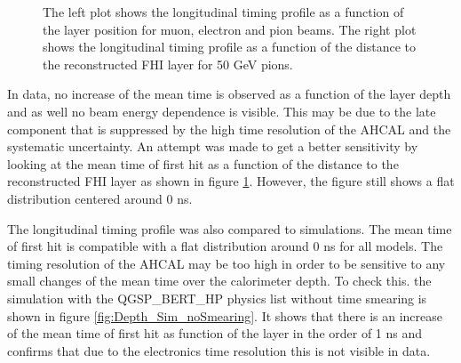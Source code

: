 \begin{figure}[htbp!]
\begin{subfigure}[t]{0.5\textwidth}
		\caption{}\label{fig:Depth_Comparison_FHI}
	\end{subfigure}
	\caption{The left plot shows the longitudinal timing profile as a function of the layer position for muon, electron and pion beams. The right plot shows the longitudinal timing profile as a function of the distance to the reconstructed FHI layer for 50 GeV pions.}
	\label{fig:DepthProfile}
\end{figure}

In data, no increase of the mean time is observed as a function of the layer depth and as well no beam energy dependence is visible. This may be due to the late component that is suppressed by the high time resolution of the AHCAL and the systematic uncertainty. An attempt was made to get a better sensitivity by looking at the mean time of first hit as a function of the distance to the reconstructed FHI layer as shown in figure \ref{fig:Depth_Comparison_FHI}. However, the figure still shows a flat distribution centered around 0 ns.

The longitudinal timing profile was also compared to simulations. The mean time of first hit is compatible with a flat distribution around 0 ns for all models. The timing resolution of the AHCAL may be too high in order to be sensitive to any small changes of the mean time over the calorimeter depth. To check this. the simulation with the QGSP\_BERT\_HP physics list without time smearing is shown in figure \ref{fig:Depth_Sim_noSmearing}. It shows that there is an increase of the mean time of first hit as function of the layer in the order of 1 ns and confirms that due to the electronics time resolution this is not visible in data.

